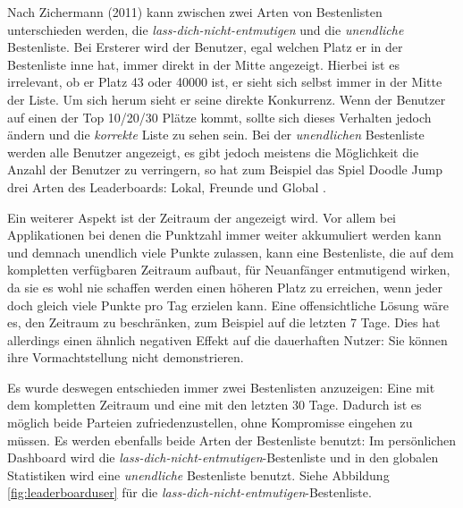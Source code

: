 \documentclass[12pt,twoside]{book}
\begin{document}
Nach Zichermann (2011) \citep[pp. 50 - 51]{zichermann2011gamification} kann zwischen zwei Arten von Bestenlisten unterschieden werden, die \textit{lass-dich-nicht-entmutigen} und die \textit{unendliche} Bestenliste. Bei Ersterer wird der Benutzer, egal welchen Platz er in der Bestenliste inne hat, immer direkt in der Mitte angezeigt. Hierbei ist es irrelevant, ob er Platz 43 oder 40000 ist, er sieht sich selbst immer in der Mitte der Liste. Um sich herum sieht er seine direkte Konkurrenz. Wenn der Benutzer auf einen der Top 10/20/30 Plätze kommt, sollte sich dieses Verhalten jedoch ändern und die \textit{korrekte} Liste zu sehen sein.
Bei der \textit{unendlichen} Bestenliste werden alle Benutzer angezeigt, es gibt jedoch meistens die Möglichkeit die Anzahl der Benutzer zu verringern, so hat zum Beispiel das Spiel Doodle Jump drei Arten des Leaderboards: Lokal, Freunde und Global \citep[pp. 51]{zichermann2011gamification}.

Ein weiterer Aspekt ist der Zeitraum der angezeigt wird. Vor allem bei Applikationen bei denen die Punktzahl immer weiter akkumuliert werden kann und demnach unendlich viele Punkte zulassen, kann eine Bestenliste, die auf dem kompletten verfügbaren Zeitraum aufbaut, für Neuanfänger entmutigend wirken, da sie es wohl nie schaffen werden einen höheren Platz zu erreichen, wenn jeder doch gleich viele Punkte pro Tag erzielen kann.
Eine offensichtliche Lösung wäre es, den Zeitraum zu beschränken, zum Beispiel auf die letzten 7 Tage. Dies hat allerdings einen ähnlich negativen Effekt auf die dauerhaften Nutzer: Sie können ihre Vormachtstellung nicht demonstrieren.

Es wurde deswegen entschieden immer zwei Bestenlisten anzuzeigen: Eine mit dem kompletten Zeitraum und eine mit den letzten 30 Tage. Dadurch ist es möglich beide Parteien zufriedenzustellen, ohne Kompromisse eingehen zu müssen. Es werden ebenfalls beide Arten der Bestenliste benutzt: Im persönlichen Dashboard wird die \textit{lass-dich-nicht-entmutigen}-Bestenliste und in den globalen Statistiken wird eine \textit{unendliche} Bestenliste benutzt. Siehe Abbildung \ref{fig:leaderboarduser} für die \textit{lass-dich-nicht-entmutigen}-Bestenliste.
\end{document}
